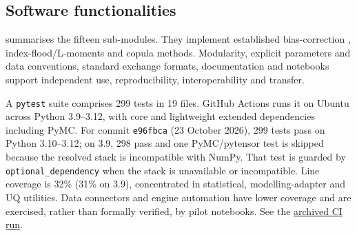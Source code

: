 \documentclass[preprint,12pt,a4paper]{elsarticle}
\begin{document}
\subsection{Software functionalities}
\label{sec:functionalities}

 summarises the fifteen sub-modules. They implement
established bias-correction \citep{teutschbein2012biascorrection},
index-flood/L-moments \citep{hosking1997rfa} and copula
\citep{genest2007copulas} methods. Modularity, explicit parameters and data
conventions, standard exchange formats, documentation and notebooks support
independent use, reproducibility, interoperability and transfer.

A \texttt{pytest} suite comprises 299 tests in 19 files. GitHub Actions runs
it on Ubuntu across Python 3.9--3.12, with core and lightweight extended
dependencies including PyMC. For commit \texttt{e96fbca} (23 October 2026),
299 tests pass on Python 3.10--3.12; on 3.9, 298 pass and one PyMC/pytensor
test is skipped because the resolved stack is incompatible with NumPy.
That test is guarded by \texttt{optional\_dependency} when the stack is
unavailable or incompatible. Line coverage is 32\% (31\% on 3.9), concentrated
in statistical, modelling-adapter and UQ utilities. Data connectors and
engine automation have lower coverage and are exercised, rather than
formally verified, by pilot notebooks. See the \href{https://github.com/navass11/pyhydra/actions/runs/39978050001}{archived CI run}.
\end{document}
